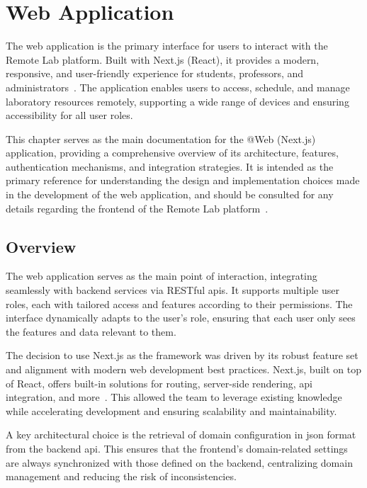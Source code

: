 \chapter{Web Application} \label{cap:web_app}

The web application is the primary interface for users to interact with the Remote Lab platform. Built with Next.js (React), it provides a modern, responsive, and user-friendly experience for students, professors, and administrators~\cite{nextjs-docs}. The application enables users to access, schedule, and manage laboratory resources remotely, supporting a wide range of devices and ensuring accessibility for all user roles.

This chapter serves as the main documentation for the @Web (Next.js) application, providing a comprehensive overview of its architecture, features, authentication mechanisms, and integration strategies. It is intended as the primary reference for understanding the design and implementation choices made in the development of the web application, and should be consulted for any details regarding the frontend of the Remote Lab platform~\cite{nextjs-docs}.

\section{Overview}
The web application serves as the main point of interaction, integrating seamlessly with backend services via RESTful \ac{api}s. It supports multiple user roles, each with tailored access and features according to their permissions. The interface dynamically adapts to the user's role, ensuring that each user only sees the features and data relevant to them.

The decision to use Next.js as the framework was driven by its robust feature set and alignment with modern web development best practices. Next.js, built on top of React, offers built-in solutions for routing, server-side rendering, \ac{api} integration, and more~\cite{nextjs-app-router,nextjs-server-client-components,nextjs-data-fetching,nextjs-api-routes}. This allowed the team to leverage existing knowledge while accelerating development and ensuring scalability and maintainability.

A key architectural choice is the retrieval of domain configuration in \ac{json} format from the backend \ac{api}. This ensures that the frontend's domain-related settings are always synchronized with those defined on the backend, centralizing domain management and reducing the risk of inconsistencies.

